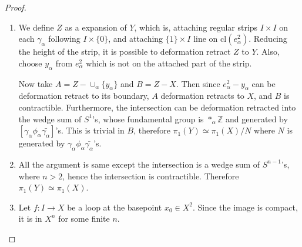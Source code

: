 \begin{proof}
\begin{enumerate}[label=(\alph*)]
\item We define $Z$ as a expansion of $Y$, which is, attaching regular strips $I\times I$ on each $\gamma_\alpha$ following $I\times \{0\}$, and attaching $\{1\}\times I$ line on $\textrm{cl}(e_\alpha^2)$. Reducing the height of the strip, it is possible to deformation retract $Z$ to $Y$. Also, choose $y_\alpha$ from $e_\alpha^2$ which is not on the attached part of the strip.

Now take $A=Z-\cup_\alpha \{y_\alpha\}$ and $B=Z-X$. Then since $e_\alpha^2-y_\alpha$ can be deformation retract to its boundary, $A$ deformation retracts to $X$, and $B$ is contractible. Furthermore, the intersection can be deformation retracted into the wedge sum of $S^1$'s, whose fundamental group is $*_\alpha \mathbb{Z}$ and generated by $[\gamma_\alpha \phi_\alpha \bar{\gamma_\alpha}]$'s. This is trivial in $B$, therefore $\pi_1(Y)\simeq \pi_1(X)/N$ where $N$ is generated by $\gamma_\alpha \phi_\alpha \bar{\gamma_\alpha}$'s.
\item All the argument is same except the intersection is a wedge sum of $S^{n-1}$'s, where $n>2$, hence the intersection is contractible. Therefore $\pi_1(Y)\simeq \pi_1(X)$.
\item Let $f:I\rightarrow X$ be a loop at the basepoint $x_0\in X^2$. Since the image is compact, it is in $X^n$ for some finite $n$.
\end{enumerate}
\end{proof}
